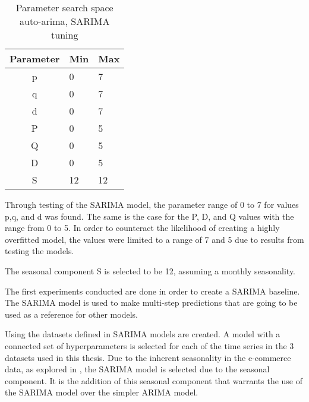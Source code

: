 \begin{table}[h]
  \centering
  \caption{Parameter search space auto-arima, SARIMA tuning}
  \label{table:method:arima-tuning}
  \begin{tabular}{|c|l|l|}\hline
    Parameter & Min & Max \\ \hline
    p         & 0   & 7   \\ \hline
    q         & 0   & 7   \\ \hline
    d         & 0   & 7   \\ \hline
    P         & 0   & 5   \\ \hline
    Q         & 0   & 5   \\ \hline
    D         & 0   & 5   \\ \hline
    S         & 12  & 12  \\ \hline
  \end{tabular}
\end{table}


Through testing of the SARIMA model, the parameter range of 0 to 7 for values p,q, and d was found.
The same is the case for the P, D, and Q values with the range from 0 to 5.
In order to counteract the likelihood of creating a highly overfitted model,
the values were limited to a range of 7 and 5 due to results from testing the models.

The seasonal component S is selected to be 12, assuming a monthly seasonality.




\iffalse



  The first experiments conducted are done in order to create a SARIMA baseline.
  The SARIMA model is used to make multi-step predictions that are going to be used as a reference for other models.

  Using the datasets defined in  SARIMA models are created.
  A model with a connected set of hyperparameters is selected for each of the time series in the 3 datasets used in this thesis.
  Due to the inherent seasonality in the e-commerce data, as explored in ,
  the SARIMA model is selected due to the seasonal component.
  It is the addition of this seasonal component that warrants the use of the SARIMA model over the simpler ARIMA model.

